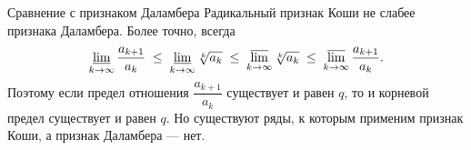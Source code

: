 \begin{Remark}{Сравнение с признаком Даламбера}{}
	Радикальный признак Коши не слабее признака Даламбера. Более точно, всегда
	\[
	\varliminf_{k\to\infty}\frac{a_{k+1}}{a_k}
	\;\le\; \varliminf_{k\to\infty}\sqrt[k]{a_k}
	\;\le\; \varlimsup_{k\to\infty}\sqrt[k]{a_k}
	\;\le\; \varlimsup_{k\to\infty}\frac{a_{k+1}}{a_k}.
	\]
	Поэтому если предел отношения $\dfrac{a_{k+1}}{a_k}$ существует и равен $q$,
	то и корневой предел существует и равен $q$. Но существуют ряды, к которым
	применим признак Коши, а признак Даламбера --- нет.
\end{Remark}